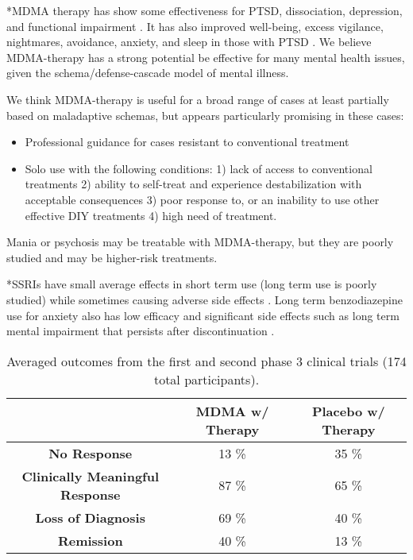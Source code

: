 \documentclass[12pt,letterpaper]{article}
\begin{document}
*MDMA therapy has show some effectiveness for PTSD, dissociation, depression, and functional impairment \cite{greenMeta}. It has also improved well-being, excess vigilance, nightmares, avoidance, anxiety, and sleep in those with PTSD \cite{smithSystematic}. We believe MDMA-therapy has a strong potential be effective for many mental health issues, given the schema/defense-cascade model of mental illness. 

We think MDMA-therapy is useful for a broad range of cases at least partially based on maladaptive schemas, but appears particularly promising in these cases:
\begin{itemize}
    \item Professional guidance for cases resistant to conventional treatment
    \item Solo use with the following conditions: 1) lack of access to conventional treatments 2) ability to self-treat and experience destabilization with acceptable consequences 3) poor response to, or an inability to use other effective DIY treatments 4) high need of treatment.
\end{itemize}
Mania or psychosis may be treatable with MDMA-therapy, but they are poorly studied and may be higher-risk treatments.

*SSRIs have small average effects in short term use (long term use is poorly studied) while sometimes causing adverse side effects \cite{ciprianiSSRI,bregginWithdrawal}. Long term benzodiazepine use for anxiety also has low efficacy and significant side effects such as long term mental impairment that persists after discontinuation \cite{shinfukuBenzo,barkerBenzo}.  
\FloatBarrier
\begin{table}[h!]
    \centering
    \caption{Averaged outcomes from the first and second phase 3 clinical trials (174 total participants)\cite{mitchellMDMAClinicalTrial,mitchellMDMAClinicalTrial2}.}
    \label{table:efficacy}
    \begin{tabular}{|c|c|c|}
    \hline
     & \textbf{MDMA w/ Therapy} & \textbf{Placebo w/ Therapy} \\ \hline
    \textbf{No Response}          & 13 \%          & 35 \%          \\ \hline
    \textbf{Clinically Meaningful Response}          & 87 \%          & 65 \%         \\ \hline
    \textbf{Loss of Diagnosis} & 69 \% & 40 \% \\ \hline
    \textbf{Remission}          & 40 \%          & 13 \%          \\ \hline
    \end{tabular}
\end{table}
\FloatBarrier
{}
\end{document}
